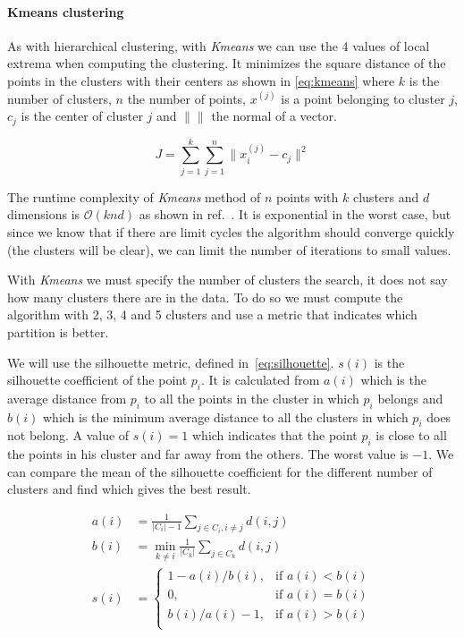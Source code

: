 \paragraph{Kmeans clustering}

As with hierarchical clustering, with \emph{Kmeans} we can use the 4 values of
local extrema when computing the clustering. It minimizes the square distance of
the points in the clusters with their centers as shown in \cref{eq:kmeans}
where $k$ is the number of clusters, $n$ the number of points,
$x^{(j)}$ is a point belonging to cluster $j$, $c_j$ is the center of
cluster $j$ and $\| \|$ the normal of a vector.

\begin{equation}\label{eq:kmeans}
    J = \sum_{j=1}^k \sum_{j=1}^n \| x_i^{(j)} - c_j \|^2
\end{equation}


The
runtime complexity of \emph{Kmeans} method of $n$ points with $k$ clusters and
$d$ dimensions is $\mathcal{O}(knd)$ as shown in
ref.~\cite{arthur_k-means_2009}.  It is exponential in the worst case, but since
we know that if there are limit cycles the algorithm should converge quickly
(the clusters will be clear), we can limit the number of iterations to small
values.

With \emph{Kmeans} we must specify the number of clusters the search, it does not
say how many clusters there are in the data. To do so we must compute the algorithm
with 2, 3, 4 and 5 clusters and use a metric that indicates which partition is better.

We will use the silhouette metric, defined in~\cref{eq:silhouette}. $s(i)$ is
the silhouette coefficient of the point $p_i$. It is calculated from $a(i)$ which
is the average distance from $p_i$ to all the points in the cluster in which $p_i$ belongs
and $b(i)$ which is the minimum average distance to all the clusters in which $p_i$ does
not belong. A value of $s(i) = 1$ which indicates that the point $p_i$ is close to
all the points in his cluster and far away from the others. The worst value is $-1$.
We can compare the mean of the silhouette coefficient for the different number of clusters
and find which gives the best result.

\begin{align}\label{eq:silhouette}
    a(i) &= \frac{1}{|C_i| - 1} \sum_{j \in C_i, i \neq j} d(i, j) \nonumber \\
    b(i) &= \min_{k \neq i} \frac{1}{|C_k|} \sum_{j \in C_k} d(i, j) \nonumber \\
    s(i) &= \begin{cases}
          1-a(i)/b(i), & \mbox{if } a(i) < b(i) \\
          0,  & \mbox{if } a(i) = b(i) \\
          b(i)/a(i)-1, & \mbox{if } a(i) > b(i) \\
        \end{cases}
\end{align}
